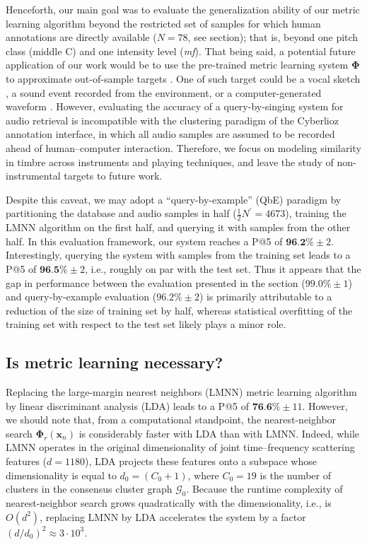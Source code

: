 \documentclass{bmcart}
\newcommand{\lnameref}[1]{%
\bgroup
\let\nmu\MakeLowercase
\nameref{#1}\egroup}
\newcommand{\nmu}{}
\begin{document}
Henceforth, our main goal was to evaluate the generalization ability of our metric learning algorithm beyond the restricted set of samples for which human annotations are directly available ($N=78$, see \lnameref{sec:survey} section); that is, beyond one pitch class (middle C) and one intensity level (\emph{mf}).
That being said, a potential future application of our work would be to use the pre-trained metric learning system $\mathbf{\Phi}$ to approximate out-of-sample targets \cite{carpentier2012cmj}.
One of such target could be a vocal sketch \cite{cartwright2015acm}, a sound event recorded from the environment, or a computer-generated waveform \cite{lemaitre2016plosone}.
However, evaluating the accuracy of a query-by-singing system for audio retrieval is incompatible with the clustering paradigm of the Cyberlioz annotation interface, in which all audio samples are assumed to be recorded ahead of human--computer interaction.
Therefore, we focus on modeling similarity in timbre across instruments and playing techniques, and leave the study of non-instrumental targets to future work.

Despite this caveat, we may adopt a ``query-by-example'' (QbE) paradigm by  partitioning the database and audio samples in half ($\frac{1}{2}N^{\prime}=4673$), training the LMNN algorithm on the first half, and querying it with samples from the other half.
In this evaluation framework, our system reaches a P@5 of $\textbf{96.2\%} \pm 2$.
Interestingly, querying the system with samples from the training set leads to a P@5 of $\textbf{96.5\%} \pm 2$, i.e., roughly on par with the test set.
Thus it appears that the gap in performance between the evaluation presented in the \lnameref{sec:results} section ($99.0\%\pm 1$) and query-by-example evaluation ($96.2\% \pm 2$) is primarily attributable to a reduction of the size of training set by half, whereas statistical overfitting of the training set with respect to the test set likely plays a minor role.


\subsection*{Is metric learning necessary?}
Replacing the large-margin nearest neighbors (LMNN) metric learning algorithm by linear discriminant analysis (LDA) leads to a P@5 of $\textbf{76.6}\% \pm 11$.
However, we should note that, from a computational standpoint, the nearest-neighbor search $\mathbf{\Phi}_r (\boldsymbol{x}_n)$ is considerably faster with LDA than with LMNN.
Indeed, while LMNN operates in the original dimensionality of joint time--frequency scattering features ($d=1180$), LDA projects these features onto a subspace whose dimensionality is equal to $d_0 = (C_0+1)$, where $C_0 = 19$ is the number of clusters in the consensus cluster graph $\mathcal{G}_0$.
Because the runtime complexity of nearest-neighbor search grows quadratically with the dimensionality, i.e., is $O(d^2)$, replacing LMNN by LDA accelerates the system by a factor $(d/d_0)^2 \approx 3 \cdot 10^3$.
\end{document}
